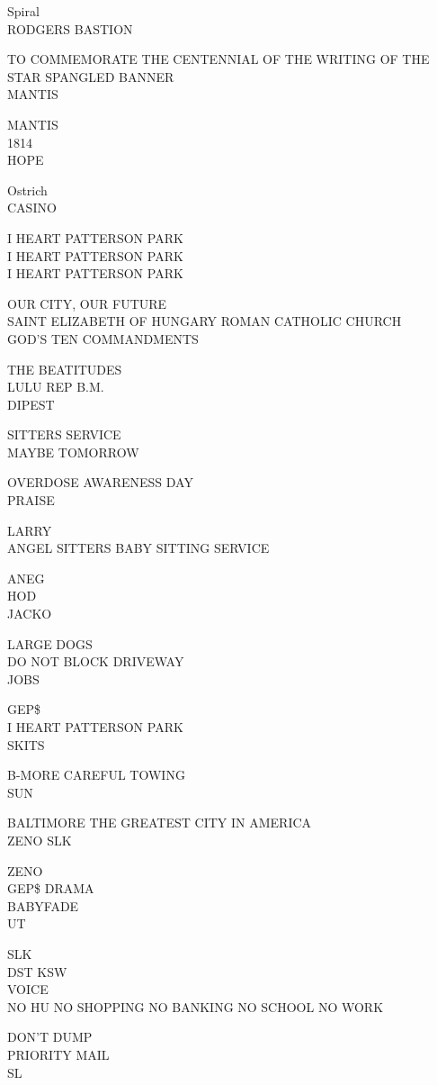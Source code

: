 \documentclass[10pt,letterpaper]{article}
\begin{document}
Spiral\\
RODGERS BASTION

TO COMMEMORATE THE CENTENNIAL OF THE WRITING OF THE STAR SPANGLED BANNER\\
MANTIS

MANTIS\\
1814\\
HOPE

Ostrich\\
CASINO

I HEART PATTERSON PARK\\
I HEART PATTERSON PARK\\
I HEART PATTERSON PARK

OUR CITY, OUR FUTURE\\
SAINT ELIZABETH OF HUNGARY ROMAN CATHOLIC CHURCH\\
GOD'S TEN COMMANDMENTS

THE BEATITUDES\\
LULU REP B.M.\\
DIPEST

SITTERS SERVICE\\
MAYBE TOMORROW

OVERDOSE AWARENESS DAY\\
PRAISE

LARRY\\
ANGEL SITTERS BABY SITTING SERVICE

ANEG\\
HOD\\
JACKO

LARGE DOGS\\
DO NOT BLOCK DRIVEWAY\\
JOBS

GEP\$\\
I HEART PATTERSON PARK\\
SKITS

B{-}MORE CAREFUL TOWING\\
SUN

BALTIMORE THE GREATEST CITY IN AMERICA\\
ZENO SLK

ZENO\\
GEP\$ DRAMA\\
BABYFADE\\
UT

SLK\\
DST KSW\\
VOICE\\
NO HU NO SHOPPING NO BANKING NO SCHOOL NO WORK

DON'T DUMP\\
PRIORITY MAIL\\
SL
\end{document}
